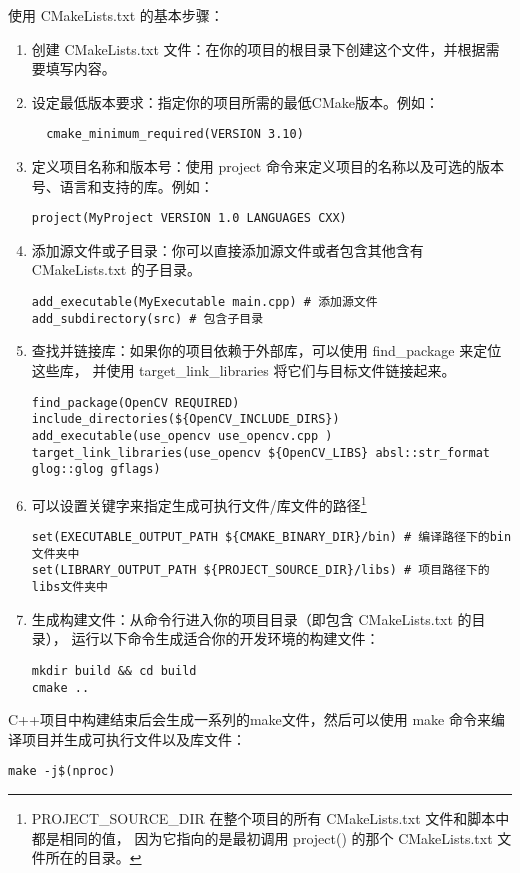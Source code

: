 \documentclass{article}
\begin{document}
使用 CMakeLists.txt 的基本步骤：
\begin{enumerate}[leftmargin=1cm]
  \item 创建 CMakeLists.txt 文件：在你的项目的根目录下创建这个文件，并根据需要填写内容。
  \item 设定最低版本要求：指定你的项目所需的最低CMake版本。例如：
\begin{verbatim}
  cmake_minimum_required(VERSION 3.10)
\end{verbatim}
  \item 定义项目名称和版本号：使用 project 命令来定义项目的名称以及可选的版本号、语言和支持的库。例如：
\begin{verbatim}
project(MyProject VERSION 1.0 LANGUAGES CXX)
\end{verbatim}
  \item 添加源文件或子目录：你可以直接添加源文件或者包含其他含有 CMakeLists.txt 的子目录。
\begin{verbatim}
add_executable(MyExecutable main.cpp) # 添加源文件
add_subdirectory(src) # 包含子目录
\end{verbatim}
  \item 查找并链接库：如果你的项目依赖于外部库，可以使用 find\_package 来定位这些库，
    并使用 target\_link\_libraries 将它们与目标文件链接起来。
\begin{verbatim}
find_package(OpenCV REQUIRED)
include_directories(${OpenCV_INCLUDE_DIRS})
add_executable(use_opencv use_opencv.cpp )
target_link_libraries(use_opencv ${OpenCV_LIBS} absl::str_format glog::glog gflags)
\end{verbatim}
\item 可以设置关键字来指定生成可执行文件/库文件的路径\footnote{
PROJECT\_SOURCE\_DIR 在整个项目的所有 CMakeLists.txt 文件和脚本中都是相同的值，
因为它指向的是最初调用 project() 的那个 CMakeLists.txt 文件所在的目录。}
\begin{verbatim}
set(EXECUTABLE_OUTPUT_PATH ${CMAKE_BINARY_DIR}/bin) # 编译路径下的bin文件夹中
set(LIBRARY_OUTPUT_PATH ${PROJECT_SOURCE_DIR}/libs) # 项目路径下的libs文件夹中
\end{verbatim}
\item 生成构建文件：从命令行进入你的项目目录（即包含 CMakeLists.txt 的目录），
  运行以下命令生成适合你的开发环境的构建文件：
\begin{verbatim}
mkdir build && cd build
cmake ..
\end{verbatim}
\end{enumerate}

C++项目中构建结束后会生成一系列的make文件，然后可以使用 
make 命令来编译项目并生成可执行文件以及库文件：
\begin{verbatim}
make -j$(nproc)
\end{verbatim}
\end{document}
